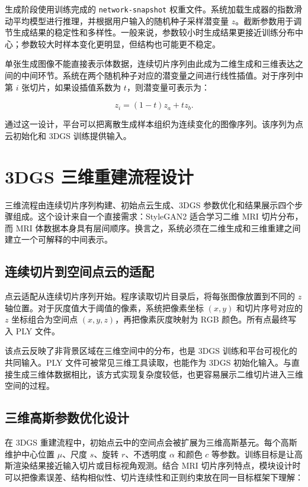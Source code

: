 生成阶段使用训练完成的 \texttt{network-snapshot} 权重文件。系统加载生成器的指数滑动平均模型进行推理，并根据用户输入的随机种子采样潜变量 $z$。截断参数用于调节生成结果的稳定性和多样性。一般来说，参数较小时生成结果更接近训练分布中心；参数较大时样本变化更明显，但结构也可能更不稳定。

单张生成图像不能直接表示体数据，连续切片序列由此成为二维生成和三维表达之间的中间环节。系统在两个随机种子对应的潜变量之间进行线性插值。对于序列中第 $i$ 张切片，如果设插值系数为 $t$，则潜变量可表示为：

\begin{equation}
z_i = (1-t)z_a + tz_b .
\end{equation}

通过这一设计，平台可以把离散生成样本组织为连续变化的图像序列。该序列为点云初始化和 3DGS 训练提供输入。

\section{3DGS 三维重建流程设计}
三维流程由连续切片序列构建、初始点云生成、3DGS 参数优化和结果展示四个步骤组成。这个设计来自一个直接需求：StyleGAN2 适合学习二维 MRI 切片分布，而 MRI 体数据本身具有层间顺序。换言之，系统必须在二维生成和三维重建之间建立一个可解释的中间表示。

\subsection{连续切片到空间点云的适配}
点云适配从连续切片序列开始。程序读取切片目录后，将每张图像放置到不同的 $z$ 轴位置。对于灰度值大于阈值的像素，系统把像素坐标 $(x,y)$ 和切片序号对应的 $z$ 坐标组合为空间点 $(x,y,z)$，再把像素灰度映射为 RGB 颜色。所有点最终写入 PLY 文件。

该点云反映了非背景区域在三维空间中的分布，也是 3DGS 训练和平台可视化的共同输入。PLY 文件可被常见三维工具读取，也能作为 3DGS 初始化输入。与直接生成三维体数据相比，该方式实现复杂度较低，也更容易展示二维切片进入三维空间的过程。

\subsection{三维高斯参数优化设计}
在 3DGS 重建流程中，初始点云中的空间点会被扩展为三维高斯基元。每个高斯维护中心位置 $\mu$、尺度 $s$、旋转 $r$、不透明度 $\alpha$ 和颜色 $c$ 等参数。训练目标是让高斯渲染结果接近输入切片或目标视角观测。结合 MRI 切片序列特点，模块设计时可以把像素误差、结构相似性、切片连续性和正则约束放在同一目标框架下理解：

